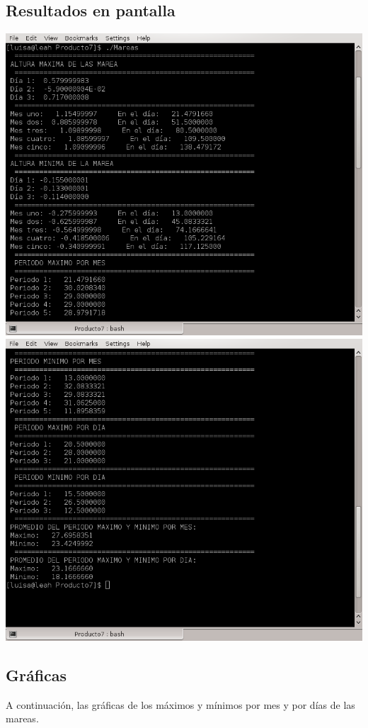 \documentclass[10pt]{article}
\begin{document}
\newpage
\subsection{Resultados en pantalla}

\includegraphics[scale=0.6]{resultadomarea1.png} \\ 
\includegraphics[scale=0.6]{resultadomarea2.png}

\newpage

\subsection{Gráficas}
A continuación, las gráficas de los máximos y mínimos por mes y por días de las mareas. 
\end{document}
